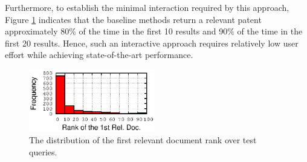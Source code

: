 Furthermore, to establish the minimal interaction required by this
approach, Figure \ref{fig:FirstTPRankHisto} indicates that the
baseline methods return a relevant patent approximately 80\% of the
time in the first 10 results and 90\% of the time in the first 20
results.  Hence, such an interactive approach requires relatively low
user effort while achieving state-of-the-art performance.


\begin{figure}
\begin{centering}
\includegraphics[width=5.5cm]{imgs/1stRank}
\par\end{centering}

\protect\caption{The distribution of the first relevant document rank over test queries.}
\label{fig:FirstTPRankHisto}
\end{figure}


